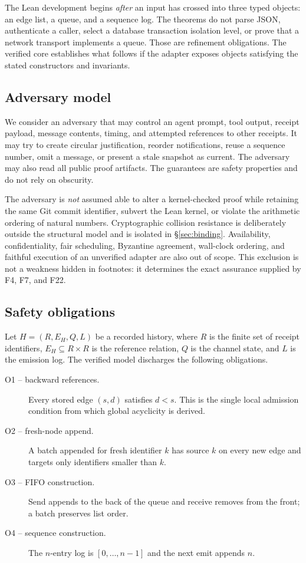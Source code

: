\documentclass[11pt,letterpaper]{article}
\theoremstyle{definition}
\begin{document}
The Lean development begins \emph{after} an input has crossed into three typed
objects: an edge list, a queue, and a sequence log. The theorems do not parse
JSON, authenticate a caller, select a database transaction isolation level, or
prove that a network transport implements a queue. Those are refinement
obligations. The verified core establishes what follows if the adapter exposes
objects satisfying the stated constructors and invariants.

\subsection{Adversary model}

We consider an adversary that may control an agent prompt, tool output, receipt
payload, message contents, timing, and attempted references to other receipts.
It may try to create circular justification, reorder notifications, reuse a
sequence number, omit a message, or present a stale snapshot as current. The
adversary may also read all public proof artifacts. The guarantees are safety
properties and do not rely on obscurity.

The adversary is \emph{not} assumed able to alter a kernel-checked proof while
retaining the same Git commit identifier, subvert the Lean kernel, or violate
the arithmetic ordering of natural numbers. Cryptographic collision resistance
is deliberately outside the structural model and is isolated in
\S\ref{sec:binding}. Availability, confidentiality, fair scheduling, Byzantine
agreement, wall-clock ordering, and faithful execution of an unverified adapter
are also out of scope. This exclusion is not a weakness hidden in footnotes: it
determines the exact assurance supplied by F4, F7, and F22.

\subsection{Safety obligations}

Let $H=(R,E_H,Q,L)$ be a recorded history, where $R$ is the finite set of
receipt identifiers, $E_H\subseteq R\times R$ is the reference relation, $Q$
is the channel state, and $L$ is the emission log. The verified model discharges
the following obligations.

\begin{description}
\item[O1 -- backward references.] Every stored edge $(s,d)$ satisfies $d<s$.
This is the single local admission condition from which global acyclicity is
derived.
\item[O2 -- fresh-node append.] A batch appended for fresh identifier $k$ has
source $k$ on every new edge and targets only identifiers smaller than $k$.
\item[O3 -- FIFO construction.] Send appends to the back of the queue and
receive removes from the front; a batch preserves list order.
\item[O4 -- sequence construction.] The $n$-entry log is
$[0,\ldots,n-1]$ and the next emit appends $n$.
\end{description}
\end{document}
